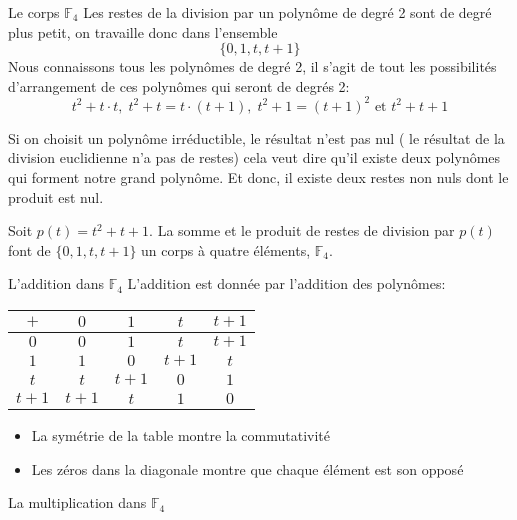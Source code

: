 \begin{parag}{Le corps $\mathbb{F}_4$}
    Les restes de la division par un polynôme de degré 2 sont de degré plus petit, on travaille donc dans l'ensemble
    \[\{0, 1,t, t+1\}\]
    Nous connaissons tous les polynômes de degré 2, il s'agit de tout les possibilités d'arrangement de ces polynômes qui seront de degrés 2:
    \[t^2 + t\cdot t, \; t^2 + t = t\cdot (t+1), \; t^2 + 1 = (t+1)^2 \text{ et } t^2 + t + 1\]
    \begin{framedremark}
        Si on choisit un polynôme irréductible, le résultat n'est pas nul ( le résultat de la division euclidienne n'a pas de restes) cela veut dire qu'il existe deux polynômes qui forment notre grand polynôme. Et donc, il existe deux restes non nuls dont le produit est nul.
    \end{framedremark}
    \begin{definition}
        Soit $p(t) = t^2 + t + 1$. La somme et le produit de restes de division par $p(t)$ font de $\{0, 1, t, t+1\}$ un corps à quatre éléments, $\mathbb{F}_4$.
    \end{definition}
    \begin{subparag}{L'addition dans $\mathbb{F}_4$}
        L'addition est donnée par l'addition des polynômes:
        \begin{tabular}{|c||c|c|c|c|}
        \hline
            $+$ & $0$ & $1$ & $t$ & $t+1$  \\
            \hline
            \hline
            $0$ & $0$ & $1$ & $t$ & $t+1$ \\
            \hline
            $1$ & $1$ & $0$ & $t+1$ & $t$ \\
            \hline
            $t$ & $t$ & $t+1$ & $0$ & $1$ \\
            \hline
            $t+1$ & $t+1$ & $t$ & $1$ & $0$ \\
            \hline
        \end{tabular}
        \begin{framedremark}
            \begin{itemize}
                \item La symétrie de la table montre la commutativité
                \item Les zéros dans la diagonale montre que chaque élément est son opposé
            \end{itemize}
        \end{framedremark}
    \end{subparag}
    \begin{subparag}{La multiplication dans $\mathbb{F}_4$}

\end{subparag}
\end{parag}
